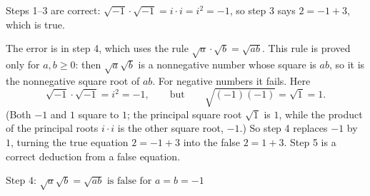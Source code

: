 Steps 1--3 are correct: $\sqrt{-1}\cdot\sqrt{-1}=i\cdot i=i^2=-1$, so step 3 says $2=-1+3$, which is true.

The error is in step 4, which uses the rule $\sqrt a\cdot\sqrt b=\sqrt{ab}$. This rule is proved only for $a,b\ge0$: then $\sqrt a\sqrt b$ is a nonnegative number whose square is $ab$, so it is the nonnegative square root of $ab$. For negative numbers it fails. Here
\[\sqrt{-1}\cdot\sqrt{-1}=i^2=-1,\qquad\text{but}\qquad\sqrt{(-1)(-1)}=\sqrt1=1.\]
(Both $-1$ and $1$ square to $1$; the principal square root $\sqrt1$ is $1$, while the product of the principal roots $i\cdot i$ is the other square root, $-1$.) So step 4 replaces $-1$ by $1$, turning the true equation $2=-1+3$ into the false $2=1+3$. Step 5 is a correct deduction from a false equation.

$\boxed{\text{Step 4: }\sqrt a\sqrt b=\sqrt{ab}\text{ is false for }a=b=-1}$
